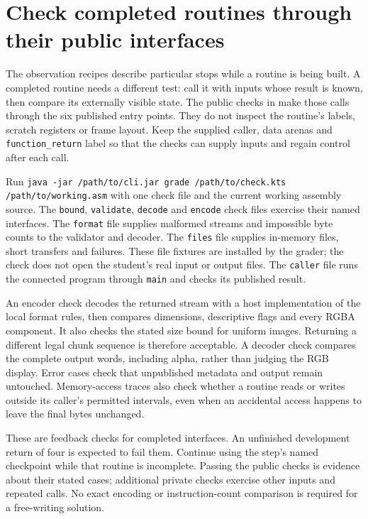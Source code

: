 \section{Check completed routines through their public interfaces}
The observation recipes describe particular stops while a routine is being built.
A completed routine needs a different test: call it with inputs whose result is known,
then compare its externally visible state. The public checks in
 make those calls through the six published entry
points. They do not inspect the routine's labels, scratch registers or frame layout.
Keep the supplied caller, data arenas and \texttt{function\_return} label so that the
checks can supply inputs and regain control after each call.

Run \texttt{java -jar /path/to/cli.jar grade /path/to/check.kts /path/to/working.asm}
with one check file and the current working assembly source. The \texttt{bound},
\texttt{validate}, \texttt{decode} and \texttt{encode} check files exercise their named
interfaces. The \texttt{format} file supplies malformed streams and impossible byte
counts to the validator and decoder. The \texttt{files} file supplies in-memory files,
short transfers and failures. These file fixtures are installed by the grader; the
check does not open the student's real input or output files. The \texttt{caller} file
runs the connected program through \texttt{main} and checks its published result.

An encoder check decodes the returned stream with a host implementation of the local
format rules, then compares dimensions, descriptive flags and every RGBA component.
It also checks the stated size bound for uniform images. Returning a different legal
chunk sequence is therefore acceptable. A decoder check compares the complete output
words, including alpha, rather than judging the RGB display. Error cases check that
unpublished metadata and output remain untouched. Memory-access traces also check
whether a routine reads or writes outside its caller's permitted intervals, even when
an accidental access happens to leave the final bytes unchanged.

These are feedback checks for completed interfaces. An unfinished development return
of four is expected to fail them. Continue using the step's named checkpoint while
that routine is incomplete. Passing the public checks is evidence about their stated
cases; additional private checks exercise other inputs and repeated calls. No exact
encoding or instruction-count comparison is required for a free-writing solution.
